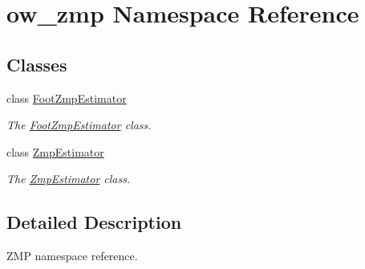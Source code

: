 \hypertarget{namespaceow__zmp}{}\section{ow\+\_\+zmp Namespace Reference}
\label{namespaceow__zmp}
\subsection*{Classes}
\begin{DoxyCompactItemize}
\item 
class \hyperlink{classow__zmp_1_1FootZmpEstimator}{Foot\+Zmp\+Estimator}
\begin{DoxyCompactList}\small\item\em The \hyperlink{classow__zmp_1_1FootZmpEstimator}{Foot\+Zmp\+Estimator} class. \end{DoxyCompactList}\item 
class \hyperlink{classow__zmp_1_1ZmpEstimator}{Zmp\+Estimator}
\begin{DoxyCompactList}\small\item\em The \hyperlink{classow__zmp_1_1ZmpEstimator}{Zmp\+Estimator} class. \end{DoxyCompactList}\end{DoxyCompactItemize}


\subsection{Detailed Description}
Z\+MP namespace reference. 